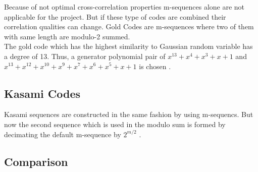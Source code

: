 Because of not optimal cross-correlation properties m-sequences alone are not applicable for the project. But if these type of codes are combined their correlation qualities can change. Gold Codes are m-sequences where two of them with same length are modulo-2 summed. \cite{proakis08} \\
The gold code which has the highest similarity to Gaussian random variable has a degree of 13. Thus, a generator polynomial pair of $x^13+x^4+x^3+x+1$ and $x^13+x^12+x^10+x^9+x^7+x^6+x^5+x+1$ is chosen \cite{merrifield} .


\subsection{Kasami Codes}

Kasami sequences are constructed in the same fashion by using m-sequencs. But now the second sequence which is used in the modulo sum is formed by decimating the default m-sequence by  $2^{m/2}$ \cite{proakis08} \cite{sarwate80} \cite{peterson72}. 

\subsection{Comparison}


